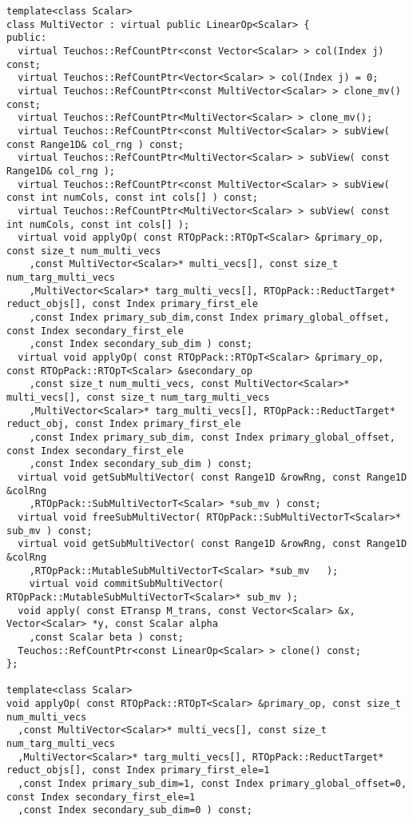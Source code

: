 {\begin{verbatim}
template<class Scalar>
class MultiVector : virtual public LinearOp<Scalar> {
public:
  virtual Teuchos::RefCountPtr<const Vector<Scalar> > col(Index j) const;
  virtual Teuchos::RefCountPtr<Vector<Scalar> > col(Index j) = 0;
  virtual Teuchos::RefCountPtr<const MultiVector<Scalar> > clone_mv() const;
  virtual Teuchos::RefCountPtr<MultiVector<Scalar> > clone_mv();
  virtual Teuchos::RefCountPtr<const MultiVector<Scalar> > subView( const Range1D& col_rng ) const;
  virtual Teuchos::RefCountPtr<MultiVector<Scalar> > subView( const Range1D& col_rng );
  virtual Teuchos::RefCountPtr<const MultiVector<Scalar> > subView( const int numCols, const int cols[] ) const;
  virtual Teuchos::RefCountPtr<MultiVector<Scalar> > subView( const int numCols, const int cols[] );
  virtual void applyOp( const RTOpPack::RTOpT<Scalar> &primary_op, const size_t num_multi_vecs
    ,const MultiVector<Scalar>* multi_vecs[], const size_t num_targ_multi_vecs
    ,MultiVector<Scalar>* targ_multi_vecs[], RTOpPack::ReductTarget* reduct_objs[], const Index primary_first_ele
    ,const Index primary_sub_dim,const Index primary_global_offset, const Index secondary_first_ele
    ,const Index secondary_sub_dim ) const;
  virtual void applyOp( const RTOpPack::RTOpT<Scalar> &primary_op, const RTOpPack::RTOpT<Scalar> &secondary_op
    ,const size_t num_multi_vecs, const MultiVector<Scalar>* multi_vecs[], const size_t num_targ_multi_vecs
    ,MultiVector<Scalar>* targ_multi_vecs[], RTOpPack::ReductTarget* reduct_obj, const Index primary_first_ele
    ,const Index primary_sub_dim, const Index primary_global_offset, const Index secondary_first_ele
    ,const Index secondary_sub_dim ) const;
  virtual void getSubMultiVector( const Range1D &rowRng, const Range1D &colRng
    ,RTOpPack::SubMultiVectorT<Scalar> *sub_mv ) const;
  virtual void freeSubMultiVector( RTOpPack::SubMultiVectorT<Scalar>* sub_mv ) const;
  virtual void getSubMultiVector( const Range1D &rowRng, const Range1D &colRng
    ,RTOpPack::MutableSubMultiVectorT<Scalar> *sub_mv	);
	virtual void commitSubMultiVector( RTOpPack::MutableSubMultiVectorT<Scalar>* sub_mv );
  void apply( const ETransp M_trans, const Vector<Scalar> &x, Vector<Scalar> *y, const Scalar alpha
    ,const Scalar beta ) const;
  Teuchos::RefCountPtr<const LinearOp<Scalar> > clone() const;
};

template<class Scalar>
void applyOp( const RTOpPack::RTOpT<Scalar> &primary_op, const size_t num_multi_vecs
  ,const MultiVector<Scalar>* multi_vecs[], const size_t num_targ_multi_vecs
  ,MultiVector<Scalar>* targ_multi_vecs[], RTOpPack::ReductTarget* reduct_objs[], const Index primary_first_ele=1
  ,const Index primary_sub_dim=1, const Index primary_global_offset=0, const Index secondary_first_ele=1
  ,const Index secondary_sub_dim=0 ) const;


\end{verbatim}}

